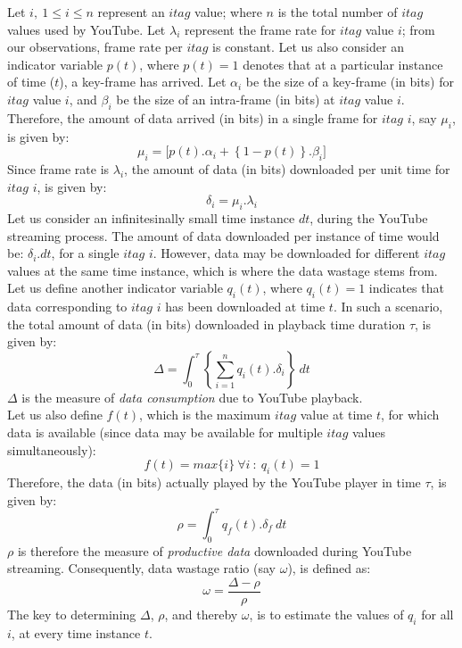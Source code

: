 Let $i,\ 1 \leq i \leq n$ represent an $itag$ value; where $n$ is the total number of $itag$ values used by YouTube.
Let $\lambda_i$ represent the frame rate for $itag$ value $i$; from our observations, frame rate per $itag$ is constant.
Let us also consider an indicator variable $p(t)$, where $p(t)=1$ denotes that at a particular instance of time ($t$), a key-frame has arrived.
Let $\alpha_i$ be the size of a key-frame (in bits) for $itag$ value $i$, and $\beta_i$ be the size of an intra-frame (in bits) at $itag$ value $i$.
Therefore, the amount of data arrived (in bits) in a single frame for $itag$ $i$, say $\mu_{i}$, is given by:
\begin{equation}
 \mu_i = \lbrack p(t).\alpha_i + \left\{1-p(t)\right\}.\beta_i \rbrack
\end{equation}
Since frame rate is $\lambda_i$, the amount of data (in bits) downloaded per unit time for $itag$ $i$, is given by:
\begin{equation}
 \delta_i = \mu_i.\lambda_i
\end{equation}
Let us consider an infinitesinally small time instance $dt$, during the YouTube streaming process. The amount of data downloaded per instance of time would be: $\delta_i.dt$, for a single $itag$ $i$.
However, data may be downloaded for different $itag$ values at the same time instance, which is where the data wastage stems from.
Let us define another indicator variable $q_{i}(t)$, where $q_{i}(t)=1$ indicates that data corresponding to $itag$ $i$ has been downloaded at time $t$.
In such a scenario, the total amount of data (in bits) downloaded in playback time duration $\tau$, is given by:
\begin{equation}
 \Delta = \int_{0}^{\tau} \left\{\sum_{i=1}^{n} q_{i}(t).\delta_{i}\right\}\ dt %
\end{equation}
$\Delta$ is the measure of {\it data consumption} due to YouTube playback.\\
Let us also define $f(t)$, which is the maximum $itag$ value at time $t$, for which data is available (since data may be available for multiple $itag$ values simultaneously):
\begin{equation}
 f(t) = max\{i\}\ \forall i\ :\ q_{i}(t) = 1
\end{equation}
Therefore, the data (in bits) actually played by the YouTube player in time $\tau$, is given by:
\begin{equation}
 \rho = \int_{0}^{\tau} q_{f}(t).\delta_{f}\ dt
\end{equation}
$\rho$ is therefore the measure of {\it productive data} downloaded during YouTube streaming.
Consequently, data wastage ratio (say $\omega$), is defined as:
\begin{equation}
 \omega = \frac{\Delta - \rho}{\rho}
\end{equation}
The key to determining $\Delta$, $\rho$, and thereby $\omega$, is to estimate the values of $q_{i}$ for all $i$, at every time instance $t$.

